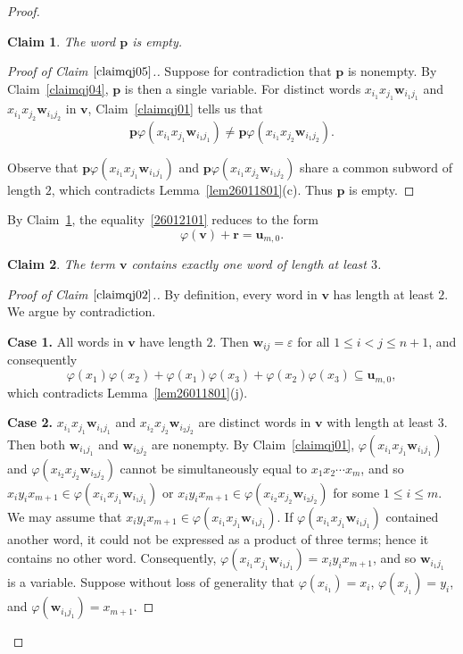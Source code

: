 \documentclass[reqno]{amsart}
\theoremstyle{plain}
\newtheorem{claim}{Claim}[section]
\theoremstyle{definition}
\newcommand{\bp}{\mathbf{p}}
\newcommand{\br}{\mathbf{r}}
\newcommand{\bu}{\mathbf{u}}
\newcommand{\bv}{\mathbf{v}}
\newcommand{\bw}{\mathbf{w}}
\begin{document}
\begin{proof}
\begin{claim}\label{claimqj05}
The word $\bp$ is empty.
\end{claim}
\begin{proof}[Proof of Claim $\ref{claimqj05}$.]
Suppose for contradiction that $\bp$ is nonempty.
By Claim~\ref{claimqj04}, $\bp$ is then a single variable.
For distinct words $x_{i_1}x_{j_1}\bw_{i_1j_1}$ and $x_{i_1}x_{j_2}\bw_{i_1j_2}$ in $\bv$,
Claim~\ref{claimqj01} tells us that
\[
\bp\varphi(x_{i_1}x_{j_1}\bw_{i_1j_1})\neq\bp\varphi(x_{i_1}x_{j_2}\bw_{i_1j_2}).
\]

Observe that $\bp\varphi(x_{i_1}x_{j_1}\bw_{i_1j_1})$ and $\bp\varphi(x_{i_1}x_{j_2}\bw_{i_1j_2})$ share a common subword of length $2$,
which contradicts Lemma~\ref{lem26011801}(c).
Thus $\bp$ is empty.
\end{proof}

By Claim~\ref{claimqj05}, the equality~\eqref{26012101} reduces to the form
\begin{equation}\label{26012102}
\varphi(\bv)+\br=\bu_{m, 0}.
\end{equation}

\begin{claim}\label{claimqj02}
The term $\bv$ contains exactly one word of length at least $3$.
\end{claim}
\begin{proof}[Proof of Claim $\ref{claimqj02}$.]
By definition, every word in $\bv$ has length at least $2$.
We argue by contradiction.

\textbf{Case 1.}
All words in $\bv$ have length $2$. Then
$\bw_{ij}=\varepsilon$ for all $1\leq i<j\leq n+1$, and consequently
\[
\varphi(x_1)\varphi(x_2)+\varphi(x_1)\varphi(x_3)+\varphi(x_2)\varphi(x_3)\subseteq \bu_{m,0},
\]
which contradicts Lemma~\ref{lem26011801}(j).

\textbf{Case 2.}
$x_{i_1}x_{j_1}\bw_{i_1j_1}$ and $x_{i_2}x_{j_2}\bw_{i_2j_2}$
are distinct words in $\bv$ with length at least $3$.
Then both $\bw_{i_1j_1}$ and $\bw_{i_2j_2}$ are nonempty.
By Claim~\ref{claimqj01},
$\varphi(x_{i_1}x_{j_1}\bw_{i_1j_1})$ and $\varphi(x_{i_2}x_{j_2}\bw_{i_2j_2})$
cannot be simultaneously equal to $x_1x_2\cdots x_m$, and so
$x_iy_ix_{m+1}\in \varphi(x_{i_1}x_{j_1}\bw_{i_1j_1})$ or $x_iy_ix_{m+1}\in \varphi(x_{i_2}x_{j_2}\bw_{i_2j_2})$ for some $1\leq i\leq m$.
We may assume that $x_iy_ix_{m+1}\in \varphi(x_{i_1}x_{j_1}\bw_{i_1j_1})$.
If $\varphi(x_{i_1}x_{j_1}\bw_{i_1j_1})$ contained another word,
it could not be expressed as a product of three terms; hence it contains no other word.
Consequently,
$\varphi(x_{i_1}x_{j_1}\bw_{i_1j_1})=x_iy_ix_{m+1}$, and so $\bw_{i_1j_1}$ is a variable.
Suppose without loss of generality that
$\varphi(x_{i_1})=x_i$, $\varphi(x_{j_1})=y_i$, and $\varphi(\bw_{i_1j_1})=x_{m+1}$.


\end{proof}
\end{proof}
\end{document}

